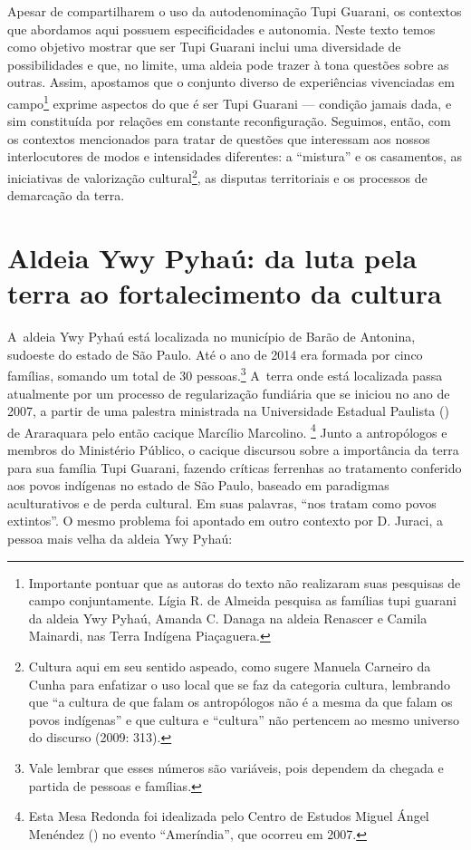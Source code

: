 Apesar de compartilharem o uso da autodenominação Tupi Guarani, os
contextos que abordamos aqui possuem especificidades e autonomia. Neste
texto temos como objetivo mostrar que ser Tupi Guarani inclui uma
diversidade de possibilidades e que, no limite, uma aldeia pode trazer
à tona questões sobre as outras. Assim, apostamos que o conjunto
diverso de experiências vivenciadas em campo\footnote{Importante
pontuar que as autoras do texto não realizaram suas pesquisas de campo
conjuntamente. Lígia R. de Almeida pesquisa as famílias tupi
guarani da aldeia Ywy Pyhaú, Amanda C. Danaga na aldeia Renascer e
Camila Mainardi, nas Terra Indígena Piaçaguera.} exprime aspectos do
que é ser Tupi Guarani --- condição jamais dada, e sim constituída por
relações em constante reconfiguração. Seguimos, então, com os contextos
mencionados para tratar de questões que interessam aos nossos
interlocutores de modos e intensidades diferentes: a ``mistura'' e os
casamentos, as iniciativas de valorização cultural\footnote{Cultura
aqui em seu sentido aspeado, como sugere Manuela Carneiro da Cunha para
enfatizar o uso local que se faz da categoria cultura, lembrando que ``a
cultura de que falam os antropólogos não é a mesma da que falam os
povos indígenas'' e que cultura e ``cultura'' não pertencem ao mesmo
universo do discurso (2009: 313).}, as disputas territoriais e os
processos de demarcação da terra. 

\section{Aldeia Ywy Pyhaú: da luta pela terra ao fortalecimento da cultura}

A~aldeia Ywy Pyhaú está localizada no município de Barão de Antonina,
sudoeste do estado de São Paulo. Até o ano de 2014 era formada por
cinco famílias, somando um total de 30 pessoas.\footnote{Vale lembrar
que esses números são variáveis, pois dependem da chegada e partida de
pessoas e famílias.} A~terra onde está localizada passa atualmente por
um processo de regularização fundiária que se iniciou no ano de 2007, a
partir de uma palestra ministrada na Universidade Estadual Paulista
() de Araraquara pelo então cacique Marcílio
Marcolino. \footnote{Esta Mesa Redonda foi idealizada pelo Centro de
Estudos Miguel Ángel Menéndez () no evento ``Ameríndia'', que ocorreu
em 2007.} Junto a antropólogos e membros do Ministério Público, o
cacique discursou sobre a importância da terra para sua família Tupi
Guarani, fazendo críticas ferrenhas ao tratamento conferido aos povos
indígenas no estado de São Paulo, baseado em paradigmas aculturativos e
de perda cultural. Em suas palavras, ``nos tratam como povos extintos''. O
mesmo problema foi apontado em outro contexto por D. Juraci, a pessoa
mais velha da aldeia Ywy Pyhaú:

